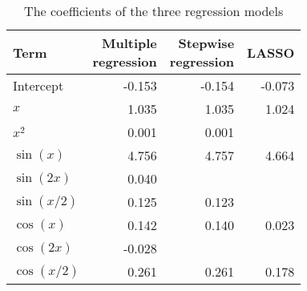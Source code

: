 \begin{table}[t]

\caption{\label{tab:compare-coefs}The coefficients of the three regression models}
\centering
\begin{tabular}{lrrr}
\toprule
Term & \makecell[r]{Multiple\\regression} & \makecell[r]{Stepwise\\regression} & LASSO\\
\midrule
Intercept & -0.153 & -0.154 & -0.073\\
\(x\) & 1.035 & 1.035 & 1.024\\
\(x^2\) & 0.001 & 0.001 & \\
\(\sin(x)\) & 4.756 & 4.757 & 4.664\\
\(\sin(2x)\) & 0.040 &  & \\
\(\sin(x/2)\) & 0.125 & 0.123 & \\
\(\cos(x)\) & 0.142 & 0.140 & 0.023\\
\(\cos(2x)\) & -0.028 &  & \\
\(\cos(x/2)\) & 0.261 & 0.261 & 0.178\\
\bottomrule
\end{tabular}
\end{table}